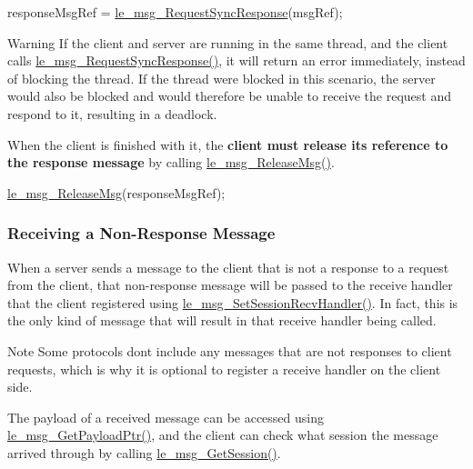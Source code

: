 \begin{DoxyCode}
responseMsgRef = \hyperlink{le__messaging_8h_aa3cf113b26b154697ccef270dafe8798}{le\_msg\_RequestSyncResponse}(msgRef);
\end{DoxyCode}


\begin{DoxyWarning}{Warning}
If the client and server are running in the same thread, and the client calls \hyperlink{le__messaging_8h_aa3cf113b26b154697ccef270dafe8798}{le\+\_\+msg\+\_\+\+Request\+Sync\+Response()}, it will return an error immediately, instead of blocking the thread. If the thread were blocked in this scenario, the server would also be blocked and would therefore be unable to receive the request and respond to it, resulting in a deadlock.
\end{DoxyWarning}
When the client is finished with it, the {\bfseries  client must release its reference to the response message } by calling \hyperlink{le__messaging_8h_afc508c24d0b6933e8fbc4e0410d50271}{le\+\_\+msg\+\_\+\+Release\+Msg()}.


\begin{DoxyCode}
\hyperlink{le__messaging_8h_afc508c24d0b6933e8fbc4e0410d50271}{le\_msg\_ReleaseMsg}(responseMsgRef);
\end{DoxyCode}
\hypertarget{c_messaging_c_messagingClientReceiving}{}\subsubsection{Receiving a Non-\/\+Response Message}\label{c_messaging_c_messagingClientReceiving}
When a server sends a message to the client that is not a response to a request from the client, that non-\/response message will be passed to the receive handler that the client registered using \hyperlink{le__messaging_8h_ac726cc93219d326e1b10a7d13a0f4f65}{le\+\_\+msg\+\_\+\+Set\+Session\+Recv\+Handler()}. In fact, this is the only kind of message that will result in that receive handler being called.

\begin{DoxyNote}{Note}
Some protocols don\textquotesingle{}t include any messages that are not responses to client requests, which is why it is optional to register a receive handler on the client side.
\end{DoxyNote}
The payload of a received message can be accessed using \hyperlink{le__messaging_8h_a32d1c7ffd913db8546f6f1bd5cce58c4}{le\+\_\+msg\+\_\+\+Get\+Payload\+Ptr()}, and the client can check what session the message arrived through by calling \hyperlink{le__messaging_8h_a253088f1b852575b60d7732ca7afc79b}{le\+\_\+msg\+\_\+\+Get\+Session()}.

